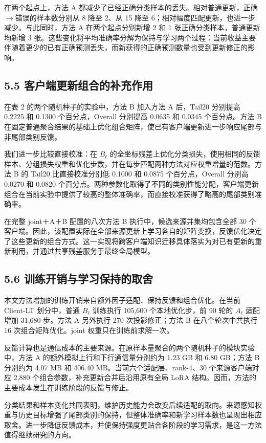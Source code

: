 \documentclass[UTF8,a4paper,10pt,fontset=fandol]{ctexart}
\begin{document}
在两个起点上，方法 A 都减少了已经正确分类样本的丢失。相对普通更新，正确$\rightarrow$错误的样本数分别从 8 降至 2、从 15 降至 6；相对幅度匹配更新，也进一步减少。与此同时，方法 A 在两个起点分别新增 2 和 1 张正确分类样本，普通更新均新增 3 张。这些变化将平均准确率分解为保持与学习两个过程：当前收益主要伴随着更少的已有正确预测丢失，而新获得的正确预测数量也受到更新修正的影响。


\subsection*{5.5 客户端更新组合的补充作用}

在表 2 的两个随机种子的实验中，方法 B 加入方法 A 后，Tail20 分别提高 0.2225 和 0.1300 个百分点，Overall 分别提高 0.0635 和 0.0345 个百分点。方法 B 在固定普通聚合结果的基础上优化组合矩阵，使已有客户端更新进一步响应尾部与非尾部类别反馈。


我们进一步比较直接校准：在 $B_\ell$ 的全坐标残差上优化分类损失，使用相同的反馈样本、分组损失权重和优化步数，并在每步匹配两种方法对应权重增量的范数。方法 B 的 Tail20 比直接校准分别低 0.1000 和 0.0875 个百分点，Overall 分别高 0.0270 和 0.0820 个百分点。两种参数化取得了不同的类别性能分配，客户端更新组合在当前实验中提供了较高的整体准确率，而直接校准获得了略高的尾部类别准确率。


在完整 joint＋A＋B 配置的八次方法 B 执行中，候选来源并集均包含全部 30 个客户端。因此，该配置实际在全部来源更新上学习各自的矩阵变换，反馈优化决定了这些更新的组合方式。这一实现将跨客户端知识迁移具体落实为对已有更新的重新利用，并通过共享残差服务于最终全局模型。


\subsection*{5.6 训练开销与学习保持的取舍}

本文方法增加的训练开销来自额外因子适配、保持反馈和组合优化。在当前 Client-LT 划分中，普通 $B_\ell$ 训练执行 105,600 个本地优化步，前 90 轮的 $A_\ell$ 适配增加 31,680 步。方法 A 另外执行 270 次投影修正；方法 B 在八个轮次中共执行 16 次组合矩阵优化。joint 权重只在训练前求解一次。


反馈计算也是通信成本的主要来源。在原样本量聚合的两个随机种子的模块实验中，方法 A 的额外模拟上行和下行通信量分别约为 1.23 GB 和 6.80 GB；方法 B 分别约为 4.07 MB 和 406.40 MB。当前六个适配层、rank-4、30 个来源客户端对应 2,880 个组合参数，补充更新合并后沿用原有全局 LoRA 结构。因而，方法的主要成本发生在训练阶段的反馈与修正。


分类结果和样本变化共同表明，维护历史能力会改变后续适配的取向。来源感知权重与历史目标增强了尾部类别的保持，但整体准确率和新学习样本数也呈现出相应取舍。进一步降低反馈成本，并使保持强度更贴合各阶段的学习需求，是这一方法值得继续研究的方向。
\end{document}
